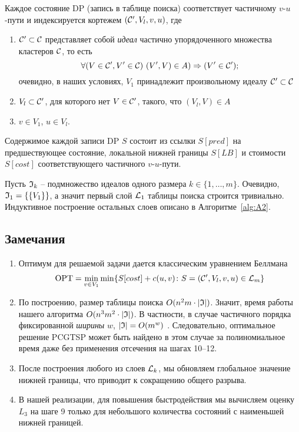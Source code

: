 Каждое состояние DP
(запись в таблице поиска)
соответствует частичному 
$v$-$u$-пути
и индексируется кортежем
$(\mathcal{C}',V_l,v, u)$, где
\begin{enumerate}
  \item
  $\mathcal{C}'\subset \mathcal{C}$ представляет собой \textit{идеал} частично упорядоченного множества кластеров $\mathcal{C}$, то есть
  \[
    \forall (V\in\mathcal{C}', V'\in\mathcal{C})\   (V',V)\in A) \Rightarrow (V'\in\mathcal{C}');
  \]
  очевидно,
  в наших условиях,
  $V_1$ 
  принадлежит произвольному идеалу
  $\mathcal{C}'\subset\mathcal{C}$

  \item
  $V_l\subset\mathcal{C}'$, 
  для которого нет 
  $V\in \mathcal{C}'$, 
  такого, что
  $(V_l,V)\in A$
  \item
  $v\in V_1$, $u\in V_l$.
\end{enumerate}
Содержимое каждой записи DP
$S$ 
состоит из ссылки
$S[pred]$
на предшествующее состояние,
локальной нижней границы
$S[LB]$
и стоимости
$S[cost]$
соответствующего частичного 
$v$-$u$-пути.

Пусть $\mathfrak{I}_k$
-- подмножество идеалов одного размера
$k\in\{1,\ldots,m\}$. 
Очевидно,
$\mathfrak{I}_1=\{\{V_1\}\}$, 
а значит первый слой
$\mathcal{L}_1$
таблицы поиска строится тривиально.
Индуктивное построение остальных слоев
описано в Алгоритме~\ref{alg:A2}.

\subsection{Замечания}
\begin{enumerate}
  \item 
  Оптимум для решаемой задачи дается классическим уравнением Беллмана
  \[
    \mathrm{OPT}=\min_{v\in V_1}\min\{S[cost]+c(u,v)\colon S=(\mathcal{C}',V_l, v, u)\in\mathcal{L}_m\}
  \]
  \item 
  По построению,
  размер таблицы поиска
  $O(n^2m\cdot |\mathfrak{I}|)$. 
  Значит, время работы нашего алгоритма
  $O(n^3m^2\cdot |\mathfrak{I}|)$. 
  В частности, 
  в случае частичного порядка фиксированной {\it ширины}
  $w$, $|\mathfrak{I}|=O(m^w)$ \cite{Steiner-1990}. 
  Следовательно,
  оптимальное решение 
  PCGTSP 
  может быть найдено в этом случае за полиномиальное время
  даже без применения отсечения на шагах 10--12.

  \item
  После построения любого из слоев
  $\mathcal{L}_k$, 
  мы обновляем глобальное значение нижней границы,
  что приводит к сокращению общего разрыва.

  \item
  В нашей реализации,
  для повышения быстродействия
  мы вычисляем оценку $L_3$ 
  на шаге 9 
  только для небольшого количества состояний
  с наименьшей нижней границей.
\end{enumerate}

